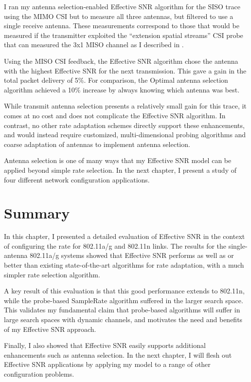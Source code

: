 I ran my antenna selection-enabled Effective SNR algorithm for the SISO trace using the MIMO CSI but to measure all three antennas, but filtered to use a single receive antenna. These measurements correspond to those that would be measured if the transmitter exploited the ``extension spatial streams'' CSI probe that can measured the 3x1 MISO channel as I described in .

Using the MISO CSI feedback, the Effective SNR algorithm chose the antenna with the highest Effective SNR for the next transmission. This gave a gain in the total packet delivery of 5\%. For comparison, the Optimal antenna selection algorithm achieved a 10\% increase by always knowing which antenna was best.

While transmit antenna selection presents a relatively small gain for this trace, it comes at no cost and does not complicate the Effective SNR algorithm. In contrast, no other rate adaptation schemes directly support these enhancements, and would instead require customized, multi-dimensional probing algorithms and coarse adaptation of antennas to implement antenna selection.

Antenna selection is one of many ways that my Effective SNR model can be applied beyond simple rate selection. In the next chapter, I present a study of four different network configuration applications.

\section{Summary}
In this chapter, I presented a detailed evaluation of Effective SNR in the context of configuring the rate for 802.11a/g and 802.11n links. The results for the single-antenna 802.11a/g systems showed that Effective SNR performs as well as or better than existing state-of-the-art algorithms for rate adaptation, with a much simpler rate selection algorithm.

A key result of this evaluation is that this good performance extends to 802.11n, while the probe-based SampleRate algorithm suffered in the larger search space. This validates my fundamental claim that probe-based algorithms will suffer in large search spaces with dynamic channels, and motivates the need and benefits of my Effective SNR approach.

Finally, I also showed that Effective SNR easily supports additional enhancements such as antenna selection. In the next chapter, I will flesh out Effective SNR applications by applying my model to a range of other configuration problems.

\ifx\mainfile\undefined

\fi
